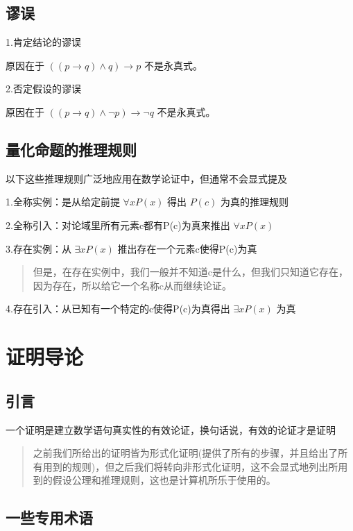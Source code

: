 \documentclass[12pt,a4paper,oneside]{ctexart}
\begin{document}
\subsection*{谬误}

1.肯定结论的谬误

原因在于 \(((p\rightarrow q)\wedge q)\rightarrow p\) 不是永真式。

2.否定假设的谬误

原因在于 \(((p\rightarrow q)\wedge \neg p)\rightarrow \neg q\) 不是永真式。

\subsection*{量化命题的推理规则}

以下这些推理规则广泛地应用在数学论证中，但通常不会显式提及

1.全称实例：是从给定前提 \(\forall xP(x)\) 得出 \(P(c)\) 为真的推理规则

2.全称引入：对论域里所有元素c都有P(c)为真来推出 \(\forall xP(x)\)

3.存在实例：从 \(\exists xP(x)\) 推出存在一个元素c使得P(c)为真

\begin{quote}
但是，在存在实例中，我们一般并不知道c是什么，但我们只知道它存在，因为存在，所以给它一个名称c从而继续论证。
\end{quote}

4.存在引入：从已知有一个特定的c使得P(c)为真得出 \(\exists xP(x)\) 为真

\section*{证明导论}

\subsection*{引言}

一个证明是建立数学语句真实性的有效论证，换句话说，有效的论证才是证明

\begin{quote}
之前我们所给出的证明皆为形式化证明(提供了所有的步骤，并且给出了所有用到的规则)，但之后我们将转向非形式化证明，这不会显式地列出所用到的假设公理和推理规则，这也是计算机所乐于使用的。
\end{quote}

\subsection*{一些专用术语}
\end{document}

